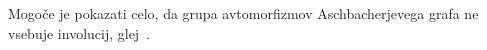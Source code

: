 \documentclass[fin1, tisk]{fmfdelo}
\newcommand{\sled}{\operatorname{sl}}
\begin{document}
\begin{opomba}
    Mogoče je pokazati celo, da grupa avtomorfizmov Aschbacherjevega grafa ne vsebuje involucij, glej~\cite{ishida2026involutionsmissingmooregraph}.
\end{opomba}






\end{document}
